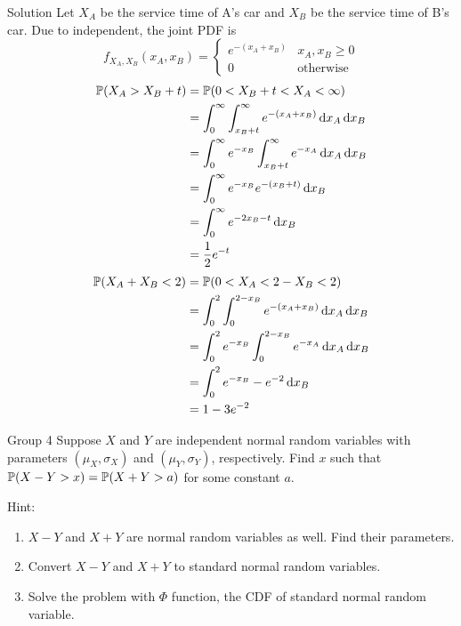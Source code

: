 \documentclass{article}
\begin{document}
\begin{solution}
    {Solution}
    Let $X_A$ be the service time of A's car and $X_B$ be the service time of B's car. Due to independent, the joint PDF is
    \[
    f_{X_A,X_B}(x_A,x_B) = {
        \begin{cases}
            e^{-(x_A+x_B)} & x_A,x_B\geq 0\\
            0 & \text{otherwise}
        \end{cases}
    }
    \]
    \begin{align*}
        \P{X_A>X_B+t}
        &= \P{0<X_B+t<X_A<\infty} \\
        &= \int_{0}^{\infty}\int_{x_B+t}^{\infty}e^{-(x_A+x_B)}\diff x_A \diff x_B \\
        &= \int_{0}^{\infty}e^{-x_B}\int_{x_B+t}^{\infty}e^{-x_A}\diff x_A \diff x_B \\
        &= \int_{0}^{\infty}e^{-x_B}e^{-(x_B+t)}\diff x_B \\
        &= \int_{0}^{\infty}e^{-2x_B-t}\diff x_B \\
        &= \frac{1}{2}e^{-t}
    \end{align*}
    \begin{align*}
        \P{X_A+X_B<2}
        &= \P{0<X_A<2-X_B<2} \\
        &= \int_{0}^{2}\int_{0}^{2-x_B}e^{-(x_A+x_B)}\diff x_A \diff x_B \\
        &= \int_{0}^{2}e^{-x_B}\int_{0}^{2-x_B}e^{-x_A}\diff x_A \diff x_B \\
        &= \int_{0}^{2}e^{-x_B}-e^{-2}\diff x_B \\
        &= 1-3e^{-2}
    \end{align*}
\end{solution}

\begin{problem}
    {Group 4}
    Suppose $X$ and $Y$ are independent normal random variables with parameters $(\mu_X,\sigma_X)$ and $(\mu_Y, \sigma_Y)$, respectively. Find $x$ such that $\P{X-Y>x}=\P{X+Y>a}$ for some constant $a$.
    \begin{solution}
        {Hint:}
        \begin{enumerate}
            \item $X-Y$ and $X+Y$ are normal random variables as well. Find their parameters.
            \item Convert $X-Y$ and $X+Y$ to standard normal random variables.
            \item Solve the problem with $\Phi$ function, the CDF of standard normal random variable.
        \end{enumerate}
    \end{solution}
\end{problem}
\end{document}
